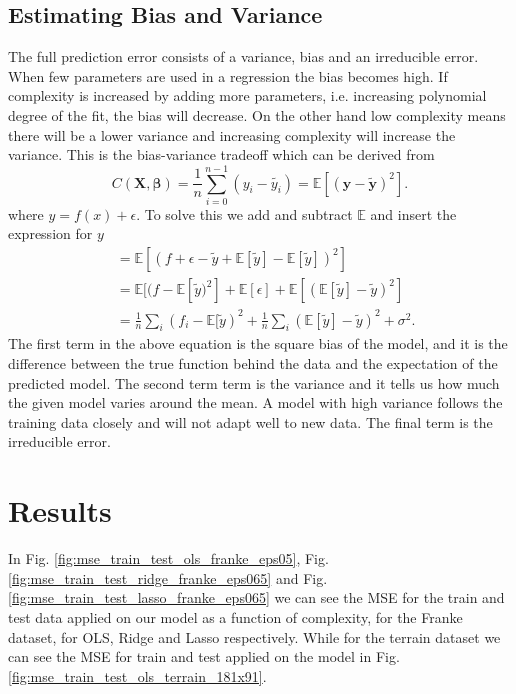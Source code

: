 \documentclass[%
 reprint,
nofootinbib,
 amsmath,amssymb,
 aps,
]{revtex4-2}
\begin{document}
\subsection{Estimating Bias and Variance}
The full prediction error consists of a variance, bias and an irreducible error. When few parameters are used in a regression the bias becomes high. If complexity is increased by adding more parameters, i.e. increasing polynomial degree of the fit, the bias will decrease. On the other hand low complexity means there will be a lower variance and increasing complexity will increase the variance. This is the bias-variance tradeoff which can be derived from
%
\begin{equation*}
   C(\boldsymbol{X}, \boldsymbol{\beta}) = \frac{1}{n} \sum_{i=0}^{n-1} (y_i - \tilde{y_i}) =  \mathbb{E}[(\boldsymbol{y} - \boldsymbol{\tilde{y}})^2].
\end{equation*}
%
where $y = f(x) + \epsilon$. To solve this we add and subtract $\mathbb{E}$ and insert the expression for $y$
%
\begin{align*}
    &=\mathbb{E}[(f + \epsilon - \tilde{y} + \mathbb{E}[\tilde{y}] - \mathbb{E}[\tilde{y}])^2]\\
    &= \mathbb{E}[(f - \mathbb{E}[\tilde{y})^2] + \mathbb{E}[\epsilon] + \mathbb{E}[(\mathbb{E}[\tilde{y}] - \tilde{y})^2]\\
    &=\frac{1}{n}\sum_i (f_i - \mathbb{E}[\tilde{y})^2 + \frac{1}{n}\sum_i (\mathbb{E}[\tilde{y}] - \tilde{y})^2 + \sigma^2.
\end{align*}
%
The first term in the above equation is the square bias of the model, and it is the difference between the true function behind the data and the expectation of the predicted model. The second term term is the variance and it tells us how much the given model varies around the mean. A model with high variance follows the training data closely and will not adapt well to new data. The final term is the irreducible error.
%


\section{Results}\label{sec:results}
In Fig. \ref{fig:mse_train_test_ols_franke_eps05}, Fig. \ref{fig:mse_train_test_ridge_franke_eps065} and Fig. \ref{fig:mse_train_test_lasso_franke_eps065} we can see the MSE for the train and test data applied on our model as a function of complexity, for the Franke dataset, for OLS, Ridge and Lasso respectively. While for the terrain dataset we can see the MSE for train and test applied on the model in Fig. \ref{fig:mse_train_test_ols_terrain_181x91}.
\end{document}
